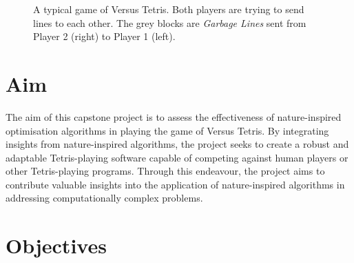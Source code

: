 \documentclass[a4paper, 12pt]{extreport}
\begin{document}
\begin{figure}
\begin{minipage}{.4\textwidth}
				\end{minipage}
				\caption{\centering A typical game of Versus Tetris. Both players are trying to send lines to each other. The grey blocks are \textit{Garbage Lines} sent from Player 2 (right) to Player 1 (left).}
				\label{fig:versus-example}
			\end{figure}
		
		\section{Aim}
		
			
			The aim of this capstone project is to assess the effectiveness of nature-inspired optimisation algorithms in playing the game of Versus Tetris. By integrating insights from nature-inspired algorithms, the project seeks to create a robust and adaptable Tetris-playing software capable of competing against human players or other Tetris-playing programs. Through this endeavour, the project aims to contribute valuable insights into the application of nature-inspired algorithms in addressing computationally complex problems.
		
		\section{Objectives}
		
			
\end{document}
